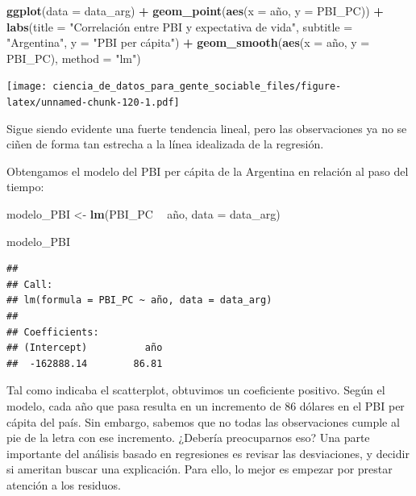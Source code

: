 \documentclass[]{book}
\newenvironment{Shaded}{\begin{snugshade}}{\end{snugshade}}
\newcommand{\KeywordTok}[1]{\textcolor[rgb]{0.13,0.29,0.53}{\textbf{#1}}}
\newcommand{\DataTypeTok}[1]{\textcolor[rgb]{0.13,0.29,0.53}{#1}}
\newcommand{\StringTok}[1]{\textcolor[rgb]{0.31,0.60,0.02}{#1}}
\newcommand{\OperatorTok}[1]{\textcolor[rgb]{0.81,0.36,0.00}{\textbf{#1}}}
\newcommand{\NormalTok}[1]{#1}
\begin{document}
\begin{Shaded}
\begin{Highlighting}[]
\KeywordTok{ggplot}\NormalTok{(}\DataTypeTok{data =}\NormalTok{ data_arg) }\OperatorTok{+}\StringTok{ }
\StringTok{    }\KeywordTok{geom_point}\NormalTok{(}\KeywordTok{aes}\NormalTok{(}\DataTypeTok{x =}\NormalTok{ año, }\DataTypeTok{y =}\NormalTok{ PBI_PC)) }\OperatorTok{+}
\StringTok{    }\KeywordTok{labs}\NormalTok{(}\DataTypeTok{title =} \StringTok{"Correlación entre PBI y expectativa de vida"}\NormalTok{,}
         \DataTypeTok{subtitle =} \StringTok{"Argentina"}\NormalTok{,}
         \DataTypeTok{y =} \StringTok{"PBI per cápita"}\NormalTok{) }\OperatorTok{+}
\StringTok{    }\KeywordTok{geom_smooth}\NormalTok{(}\KeywordTok{aes}\NormalTok{(}\DataTypeTok{x =}\NormalTok{ año, }\DataTypeTok{y =}\NormalTok{ PBI_PC), }\DataTypeTok{method =} \StringTok{"lm"}\NormalTok{)}
\end{Highlighting}
\end{Shaded}

\texttt{[image: ciencia\_de\_datos\_para\_gente\_sociable\_files/figure-latex/unnamed-chunk-120-1.pdf]}

Sigue siendo evidente una fuerte tendencia lineal, pero las
observaciones ya no se ciñen de forma tan estrecha a la línea idealizada
de la regresión.

Obtengamos el modelo del PBI per cápita de la Argentina en relación al
paso del tiempo:

\begin{Shaded}
\begin{Highlighting}[]
\NormalTok{modelo_PBI <-}\StringTok{ }\KeywordTok{lm}\NormalTok{(PBI_PC }\OperatorTok{~}\StringTok{ }\NormalTok{año, }\DataTypeTok{data =}\NormalTok{ data_arg)}

\NormalTok{modelo_PBI}
\end{Highlighting}
\end{Shaded}

\begin{verbatim}
## 
## Call:
## lm(formula = PBI_PC ~ año, data = data_arg)
## 
## Coefficients:
## (Intercept)          año  
##  -162888.14        86.81
\end{verbatim}

Tal como indicaba el scatterplot, obtuvimos un coeficiente positivo.
Según el modelo, cada año que pasa resulta en un incremento de 86
dólares en el PBI per cápita del país. Sin embargo, sabemos que no todas
las observaciones cumple al pie de la letra con ese incremento. ¿Debería
preocuparnos eso? Una parte importante del análisis basado en
regresiones es revisar las desviaciones, y decidir si ameritan buscar
una explicación. Para ello, lo mejor es empezar por prestar atención a
los residuos.
\end{document}
